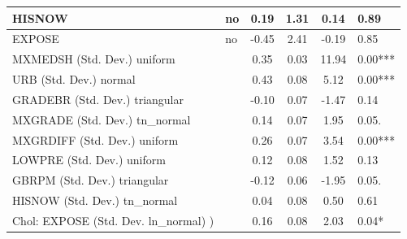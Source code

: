 \begin{table}
\begin{center}
\begin{tabular}{|l|l|c|c|c|l|}
			\hline
			HISNOW & no & 0.19 & 1.31 & 0.14 & 0.89 \\
			\hline
			EXPOSE & no & -0.45 & 2.41 & -0.19 & 0.85 \\
			\hline
			MXMEDSH (Std. Dev.) uniform &  & 0.35 & 0.03 & 11.94 & 0.00*** \\
			\hline
			URB (Std. Dev.) normal &  & 0.43 & 0.08 & 5.12 & 0.00*** \\
			\hline
			GRADEBR (Std. Dev.) triangular &  & -0.10 & 0.07 & -1.47 & 0.14 \\
			\hline
			MXGRADE (Std. Dev.) tn_normal &  & 0.14 & 0.07 & 1.95 & 0.05. \\
			\hline
			MXGRDIFF (Std. Dev.) uniform &  & 0.26 & 0.07 & 3.54 & 0.00*** \\
			\hline
			LOWPRE (Std. Dev.) uniform &  & 0.12 & 0.08 & 1.52 & 0.13 \\
			\hline
			GBRPM (Std. Dev.) triangular &  & -0.12 & 0.06 & -1.95 & 0.05. \\
			\hline
			HISNOW (Std. Dev.) tn_normal &  & 0.04 & 0.08 & 0.50 & 0.61 \\
			\hline
			 Chol: EXPOSE (Std. Dev. ln_normal) ) &  & 0.16 & 0.08 & 2.03 & 0.04* \\
			\hline
		\end{tabular}
	\end{center}
\end{table}
